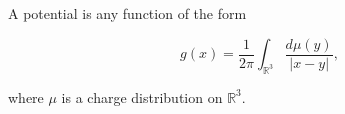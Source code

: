 A potential is any function of the form

$$g(x) = \frac{1}{2\pi} \int_{\mathbb{R}^3} \frac{d\mu(y)}{|x - y|},$$

where $\mu$ is a charge distribution on $\mathbb{R}^3$.
